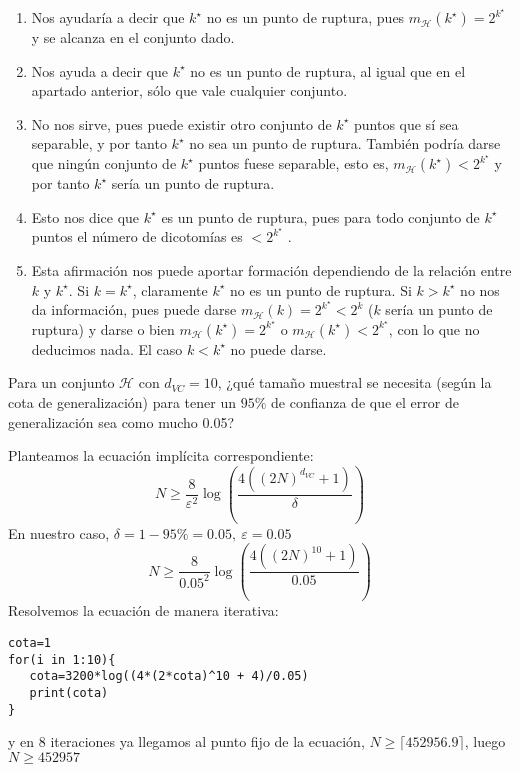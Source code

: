 \documentclass[11pt,leqno]{article}
\theoremstyle{definition}
\begin{document}
\begin{solucion} \textbf{ }
\begin{enumerate}[a]
\item  Nos ayudaría a decir que $k^\star$ no es un punto de ruptura, pues $m_\mathcal{H}(k^\star)= 2^{k^\star}$ y se alcanza en el conjunto dado.
\item  Nos ayuda a decir que $k^\star$ no es un punto de ruptura, al igual que en el apartado anterior, sólo que vale cualquier conjunto.
\item  No nos sirve, pues puede existir otro conjunto de $k^\star$ puntos que sí sea separable, y por tanto $k^\star$ no sea un punto de ruptura. También podría darse que ningún conjunto de $k^\star$ puntos fuese separable, esto es, $m_\mathcal{H}(k^\star) < 2^{k^\star}$ y por tanto $k^\star$ sería un punto de ruptura.
\item  Esto nos dice que $k^\star$ es un punto de ruptura, pues para todo conjunto de $k^\star$ puntos el número de dicotomías es $< 2^{k^\star}$ .
\item  Esta afirmación nos puede aportar formación dependiendo de la relación entre $k$ y $k^\star$. Si $k = k^\star$, claramente $k^\star$ no es un punto de ruptura. Si $k > k^\star$ no nos da información, pues puede darse $m_{\mathcal{H}}(k)= 2^{k^\star}<2^k$ ($k$ sería un punto de ruptura) y darse o bien $m_{\mathcal{H}}(k^\star) = 2^{k^\star}$ o $m_{\mathcal{H}}(k^\star) < 2^{k^\star}$, con lo que no deducimos nada. El caso $k < k^\star$ no puede darse.
\end{enumerate}
\end{solucion}

\begin{cuestion}
Para un conjunto $\mathcal{H}$ con $d_{VC} = 10$, ¿qué tamaño muestral se necesita (según la cota de generalización) para tener un $95\%$ de confianza de que el error de generalización sea como mucho 0.05?
\end{cuestion}

\begin{solucion}
Planteamos la ecuación implícita correspondiente:
	\[ N \geq \frac{8}{\varepsilon^2} \log\left( \frac{4((2N)^{d_{VC}}+1)}{\delta}\right) \]
En nuestro caso, $\delta = 1-95\%= 0.05,\ \varepsilon=0.05$
	\[ N \geq \frac{8}{0.05^2} \log\left( \frac{4((2N)^10+1)}{0.05}\right) \]
Resolvemos la ecuación de manera iterativa:

\begin{lstlisting}
cota=1
for(i in 1:10){
   cota=3200*log((4*(2*cota)^10 + 4)/0.05)
   print(cota)
}
\end{lstlisting}
y en 8 iteraciones ya llegamos al punto fijo de la ecuación, $N \geq \lceil 452956.9 \rceil$, luego $N \geq 452957$
\end{solucion}
\end{document}
